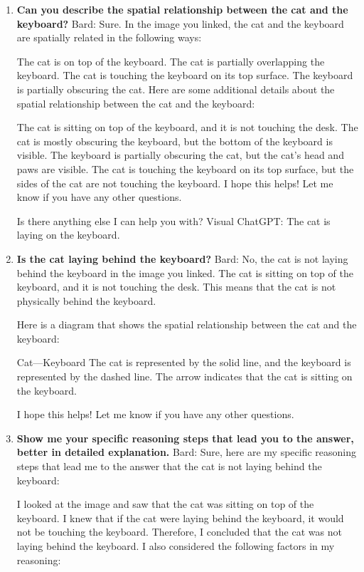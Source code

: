     \begin{enumerate}
        \item \textbf{Can you describe the spatial relationship between the cat and the keyboard?}
        \subitem Bard: 
        Sure. In the image you linked, the cat and the keyboard are spatially related in the following ways:
        
        The cat is on top of the keyboard.
        The cat is partially overlapping the keyboard.
        The cat is touching the keyboard on its top surface.
        The keyboard is partially obscuring the cat.
        Here are some additional details about the spatial relationship between the cat and the keyboard:
        
        The cat is sitting on top of the keyboard, and it is not touching the desk.
        The cat is mostly obscuring the keyboard, but the bottom of the keyboard is visible.
        The keyboard is partially obscuring the cat, but the cat's head and paws are visible.
        The cat is touching the keyboard on its top surface, but the sides of the cat are not touching the keyboard.
        I hope this helps! Let me know if you have any other questions.
        
        Is there anything else I can help you with?
        \subitem Visual ChatGPT: The cat is laying on the keyboard.
        \item \textbf{Is the cat laying behind the keyboard?}
        \subitem Bard: 
        No, the cat is not laying behind the keyboard in the image you linked. The cat is sitting on top of the keyboard, and it is not touching the desk. This means that the cat is not physically behind the keyboard.
        
        Here is a diagram that shows the spatial relationship between the cat and the keyboard:
        
        Cat---Keyboard
        The cat is represented by the solid line, and the keyboard is represented by the dashed line. The arrow indicates that the cat is sitting on the keyboard.
        
        I hope this helps! Let me know if you have any other questions.
        \item \textbf{Show me your specific reasoning steps that lead you to the answer, better in detailed explanation.}
        \subitem Bard: Sure, here are my specific reasoning steps that lead me to the answer that the cat is not laying behind the keyboard:

        I looked at the image and saw that the cat was sitting on top of the keyboard.
        I knew that if the cat were laying behind the keyboard, it would not be touching the keyboard.
        Therefore, I concluded that the cat was not laying behind the keyboard.
        I also considered the following factors in my reasoning:
        

\end{enumerate}
